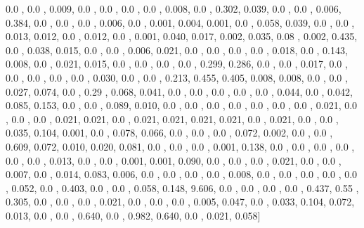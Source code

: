 \documentclass[usenames,dvipsnames]{article} %
\begin{document}
0.0  , 0.0  , 0.009, 0.0  , 0.0  , 0.0  , 0.0  , 0.008, 0.0  , 0.302, 0.039, 0.0  , 0.0  , 0.006, 0.384, 0.0  , 0.0  , 0.0  , 0.006, 0.0  , 0.001, 0.004, 0.001, 0.0  , 0.058, 0.039, 0.0  , 0.0  , 0.013, 0.012, 0.0  , 0.012, 0.0  , 0.001, 0.040, 0.017, 0.002, 0.035, 0.08 , 0.002, 0.435, 0.0  , 0.038, 0.015, 0.0  , 0.0  , 0.006, 0.021, 0.0  , 0.0  , 0.0  , 0.0  , 0.018, 0.0  , 0.143, 0.008, 0.0  , 0.021, 0.015, 0.0  , 0.0  , 0.0  , 0.0  , 0.299, 0.286, 0.0  , 0.0  , 0.017, 0.0  , 0.0  , 0.0  , 0.0  , 0.0  , 0.030, 0.0  , 0.0  , 0.213, 0.455, 0.405, 0.008, 0.008, 0.0  , 0.0  , 0.027, 0.074, 0.0  , 0.29 , 0.068, 0.041, 0.0  , 0.0  , 0.0  , 0.0  , 0.0  , 0.044, 0.0  , 0.042, 0.085, 0.153, 0.0  , 0.0  , 0.089, 0.010, 0.0  , 0.0  , 0.0  , 0.0  , 0.0  , 0.0  , 0.0  , 0.021, 0.0  , 0.0  , 0.0  , 0.021, 0.021, 0.0  , 0.021, 0.021, 0.021, 0.021, 0.0  , 0.021, 0.0  , 0.0  , 0.035, 0.104, 0.001, 0.0  , 0.078, 0.066, 0.0  , 0.0  , 0.0  , 0.072, 0.002, 0.0  , 0.0  , 0.609, 0.072, 0.010, 0.020, 0.081, 0.0  , 0.0  , 0.0  , 0.001, 0.138, 0.0  , 0.0  , 0.0  , 0.0  , 0.0  , 0.0  , 0.013, 0.0  , 0.0  , 0.001, 0.001, 0.090, 0.0  , 0.0  , 0.0  , 0.021, 0.0  , 0.0  , 0.007, 0.0  , 0.014, 0.083, 0.006, 0.0  , 0.0  , 0.0  , 0.0  , 0.008, 0.0  , 0.0  , 0.0  , 0.0  , 0.0  , 0.052, 0.0  , 0.403, 0.0  , 0.0  , 0.058, 0.148, 9.606, 0.0  , 0.0  , 0.0  , 0.0  , 0.437, 0.55 , 0.305, 0.0  , 0.0  , 0.0  , 0.021, 0.0  , 0.0  , 0.0  , 0.005, 0.047, 0.0  , 0.033, 0.104, 0.072, 0.013, 0.0  , 0.0  , 0.640, 0.0  , 0.982, 0.640, 0.0  , 0.021, 0.058]
\end{document}
